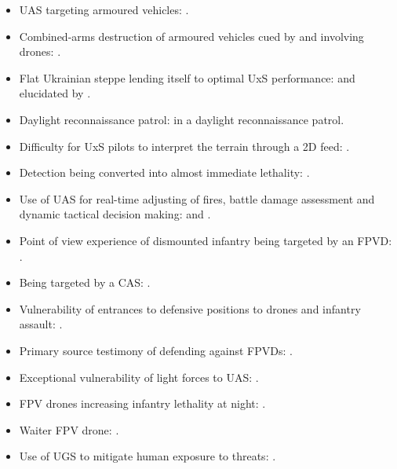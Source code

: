 \begin{itemize}
	\item UAS targeting armoured vehicles: \textcite{TANK_FPV9,TANK_FPV,TANK_FPV3,TANK_FPV4,TANK_FPV6,TANK_FPV9,TANK_FPV8}.
	\item Combined-arms destruction of armoured vehicles cued by and involving drones:  \textcite{TANK_FPV9,TANK_FPV1,TANK_FPV2,TANK_FPV5,TANK_FPV7}.
	\item Flat Ukrainian steppe lending itself to optimal UxS performance: \textcite{ombr72_2023_03_02_funny_fairytale_for_adults} and elucidated by \textcite{JONES_2023}.
	\item Daylight reconnaissance patrol: \textcite{tac_groiup_2026_2_27} in a daylight reconnaissance patrol.
	\item Difficulty for UxS pilots to interpret the terrain through a 2D feed: \textcite{magyar_telegram_FPV_inf_plying_dead}.
	\item Detection being converted into almost immediate lethality: \textcite{azov_media_20240703_no_one_left_to_finish_off}.
	\item Use of UAS for real-time adjusting of fires, battle damage assessment and dynamic tactical decision making: \textcite{azov_media_20240717_three_russian_soldiers_surrender_azov} and \textcite[14:50--20:00]{Wali}.
	\item Point of view experience of dismounted infantry being targeted by an FPVD: \textcite{zandar_2025}.
	\item Being targeted by a CAS: \textcite[1:53--1:58]{Trofimova}.
	\item Vulnerability of entrances to defensive positions to drones and infantry assault: \textcite{225_oshp_2026_03_11_russian_destroy_open,landforces_ukraine_2026_fpv_seen_2026_3_24,tretii_armiiskyi_korpus_2023_3_12_prisoners,azov_media_2025_05_28_assault,mod_russia_telegram_attack_bunker}.
	\item Primary source testimony of defending against FPVDs: \textcite{Tyshchenko_2026_03_20_ukraine_bunker_story}.
	\item Exceptional vulnerability of light forces to UAS: \textcite{azov_media_20240522_enemy_infantry_outside_cover_night_drones,azov_media_20240606_night_elimination_enemy_infantry_kreminna}.
	\item FPV drones increasing infantry lethality at night: \textcite{zandar_2025}.
	\item Waiter FPV drone:  \textcite{rosgvardiya_20250826_kharkiv_steel_brigade_uav_infantry_strike}.
	\item Use of UGS to mitigate human exposure to threats: \textcite{third_army_corps_2025_10_23}.

\end{itemize}

